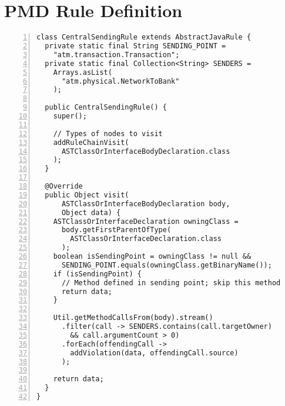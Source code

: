 \chapter{PMD Rule Definition}
\label{apx:pmd}

\begin{lstlisting}[caption={PMD custom rule that enforces constraint 3.}, captionpos=b, label=lst:pmd_rule, numbers=left, showstringspaces=false]
class CentralSendingRule extends AbstractJavaRule {
  private static final String SENDING_POINT =
    "atm.transaction.Transaction";
  private static final Collection<String> SENDERS =
    Arrays.asList(
      "atm.physical.NetworkToBank"
    );

  public CentralSendingRule() {
    super();

    // Types of nodes to visit
    addRuleChainVisit(
      ASTClassOrInterfaceBodyDeclaration.class
    );
  }

  @Override
  public Object visit(
      ASTClassOrInterfaceBodyDeclaration body,
      Object data) {
    ASTClassOrInterfaceDeclaration owningClass =
      body.getFirstParentOfType(
        ASTClassOrInterfaceDeclaration.class
      );
    boolean isSendingPoint = owningClass != null &&
      SENDING_POINT.equals(owningClass.getBinaryName());
    if (isSendingPoint) {
      // Method defined in sending point; skip this method
      return data;
    }

    Util.getMethodCallsFrom(body).stream()
      .filter(call -> SENDERS.contains(call.targetOwner)
        && call.argumentCount > 0)
      .forEach(offendingCall -> 
        addViolation(data, offendingCall.source)
      );

    return data;
  }
}
\end{lstlisting}